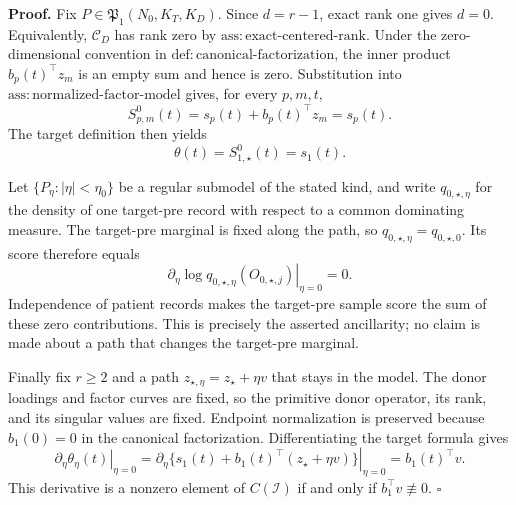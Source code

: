 \textbf{Proof.}
Fix \(P\in\mathfrak P_1(N_0,K_T,K_D)\).  Since \(d=r-1\), exact rank one gives \(d=0\).  Equivalently, \(\mathcal C_D\) has rank zero by \(\mathrm{ass:exact\mbox{-}centered\mbox{-}rank}\).  Under the zero-dimensional convention in \(\mathrm{def:canonical\mbox{-}factorization}\), the inner product \(b_p(t)^\top z_m\) is an empty sum and hence is zero.  Substitution into \(\mathrm{ass:normalized\mbox{-}factor\mbox{-}model}\) gives, for every \(p,m,t\),
\[
 S^0_{p,m}(t)=s_p(t)+b_p(t)^\top z_m=s_p(t).
\]
The target definition then yields
\[
 \theta(t)=S^0_{1,\star}(t)=s_1(t).
\]

Let \(\{P_\eta:|\eta|<\eta_0\}\) be a regular submodel of the stated kind, and write \(q_{0,\star,\eta}\) for the density of one target-pre record with respect to a common dominating measure.  The target-pre marginal is fixed along the path, so \(q_{0,\star,\eta}=q_{0,\star,0}\).  Its score therefore equals
\[
 \left.\partial_\eta\log q_{0,\star,\eta}(O_{0,\star,j})\right|_{\eta=0}=0.
\]
Independence of patient records makes the target-pre sample score the sum of these zero contributions.  This is precisely the asserted ancillarity; no claim is made about a path that changes the target-pre marginal.

Finally fix \(r\ge2\) and a path \(z_{\star,\eta}=z_\star+\eta v\) that stays in the model.  The donor loadings and factor curves are fixed, so the primitive donor operator, its rank, and its singular values are fixed.  Endpoint normalization is preserved because \(b_1(0)=0\) in the canonical factorization.  Differentiating the target formula gives
\[
 \left.\partial_\eta\theta_\eta(t)\right|_{\eta=0}
 =\left.\partial_\eta\{s_1(t)+b_1(t)^\top(z_\star+\eta v)\}\right|_{\eta=0}
 =b_1(t)^\top v.
\]
This derivative is a nonzero element of \(C(\mathcal I)\) if and only if \(b_1^\top v\not\equiv0\). \(\square\)